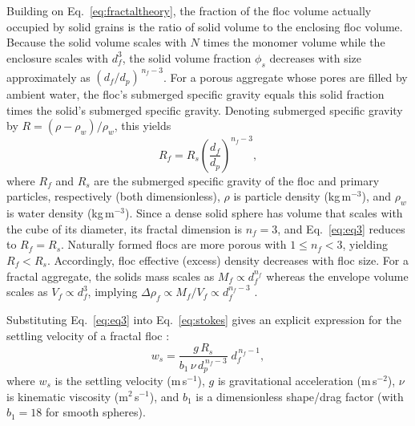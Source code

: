 \documentclass{agujournal2019}
\providecommand{\DIFadd}[1]{{\protect\color{blue}#1}}
\begin{document}
Building on Eq.~\eqref{eq:fractaltheory}, the fraction of the floc volume actually occupied by solid grains is the ratio of solid volume to the enclosing floc volume. Because the solid volume scales with $N$ times the monomer volume while the enclosure scales with $d_f^{3}$, \DIFadd{the solid volume fraction }$\phi_s$ decreases with size approximately as $(d_f/d_p)^{\,n_f-3}$. For a porous aggregate whose pores are filled by ambient water, the floc’s submerged specific gravity equals this solid fraction times the solid’s submerged specific gravity. Denoting submerged specific gravity by $R=(\rho-\rho_w)/\rho_w$, this yields
\begin{equation}
R_f = R_s \left( \frac{d_f}{d_p} \right)^{n_f - 3},
    \label{eq:eq3}
\end{equation}
where $R_f$ and $R_s$ are the submerged specific gravity of the floc and primary particles, respectively (both dimensionless), $\rho$ is particle density (kg\,m$^{-3}$), and $\rho_w$ is water density (kg\,m$^{-3}$). Since a dense solid sphere has volume that scales with the cube of its diameter, its fractal dimension is $n_f=3$, and Eq.~\eqref{eq:eq3} reduces to $R_f=R_s$. Naturally formed flocs are more porous with $1 \le n_f < 3$, yielding $R_f<R_s$. \DIFadd{Accordingly, floc effective (excess) density decreases with floc size. For a fractal aggregate, the solids mass scales as $M_f \propto d_f^{n_f}$ whereas the envelope volume scales as $V_f \propto d_f^{3}$, implying $\Delta \rho_f \propto M_f / V_f \propto d_f^{n_f-3}$ \cite{kranenburg1994fractal}.}

Substituting Eq.~\eqref{eq:eq3} into Eq.~\eqref{eq:stokes} gives an explicit expression for the settling velocity of a fractal floc \cite{strom2011explicit, winterwerp1998simple}:
\begin{equation}
    w_s = \frac{g\,R_s}{b_1\,\nu\,d_p^{\,n_f - 3}}\; d_f^{\,n_f - 1},
    \label{eq:floc_settling}
\end{equation}
where $w_s$ is the settling velocity (m\,s$^{-1}$), $g$ is gravitational acceleration (m\,s$^{-2}$), $\nu$ is kinematic viscosity (m$^{2}$\,s$^{-1}$), and $b_1$ is a dimensionless shape/drag factor (with $b_1=18$ for smooth spheres).
\end{document}
